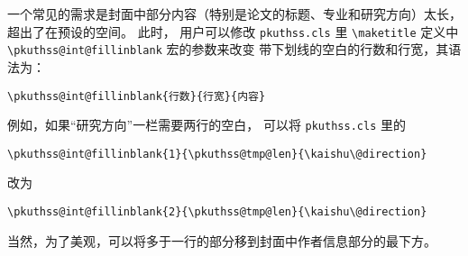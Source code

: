 一个常见的需求是封面中部分内容（特别是论文的标题、专业和研究方向）太长，
超出了在预设的空间。
此时，
用户可以修改 \verb|pkuthss.cls| 里 \verb|\maketitle| 定义中
\verb|\pkuthss@int@fillinblank| 宏的参数来改变
带下划线的空白的行数和行宽，其语法为：
\begin{Verbatim}[frame = single]
\pkuthss@int@fillinblank{行数}{行宽}{内容}
\end{Verbatim}
例如，如果“研究方向”一栏需要两行的空白，
可以将 \verb|pkuthss.cls| 里的
\begin{Verbatim}[frame = single]
\pkuthss@int@fillinblank{1}{\pkuthss@tmp@len}{\kaishu\@direction}
\end{Verbatim}
改为
\begin{Verbatim}[frame = single]
\pkuthss@int@fillinblank{2}{\pkuthss@tmp@len}{\kaishu\@direction}
\end{Verbatim}
当然，为了美观，可以将多于一行的部分移到封面中作者信息部分的最下方。

